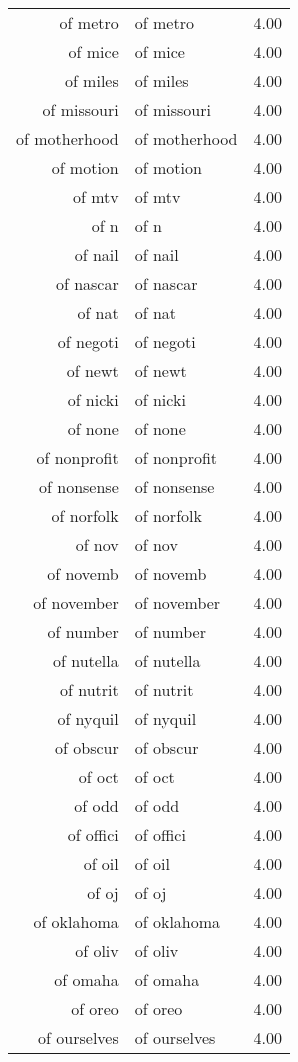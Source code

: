 \begin{table}[ht]
\begin{tabular}{rlr}
  of metro & of metro & 4.00 \\ 
  of mice & of mice & 4.00 \\ 
  of miles & of miles & 4.00 \\ 
  of missouri & of missouri & 4.00 \\ 
  of motherhood & of motherhood & 4.00 \\ 
  of motion & of motion & 4.00 \\ 
  of mtv & of mtv & 4.00 \\ 
  of n & of n & 4.00 \\ 
  of nail & of nail & 4.00 \\ 
  of nascar & of nascar & 4.00 \\ 
  of nat & of nat & 4.00 \\ 
  of negoti & of negoti & 4.00 \\ 
  of newt & of newt & 4.00 \\ 
  of nicki & of nicki & 4.00 \\ 
  of none & of none & 4.00 \\ 
  of nonprofit & of nonprofit & 4.00 \\ 
  of nonsense & of nonsense & 4.00 \\ 
  of norfolk & of norfolk & 4.00 \\ 
  of nov & of nov & 4.00 \\ 
  of novemb & of novemb & 4.00 \\ 
  of november & of november & 4.00 \\ 
  of number & of number & 4.00 \\ 
  of nutella & of nutella & 4.00 \\ 
  of nutrit & of nutrit & 4.00 \\ 
  of nyquil & of nyquil & 4.00 \\ 
  of obscur & of obscur & 4.00 \\ 
  of oct & of oct & 4.00 \\ 
  of odd & of odd & 4.00 \\ 
  of offici & of offici & 4.00 \\ 
  of oil & of oil & 4.00 \\ 
  of oj & of oj & 4.00 \\ 
  of oklahoma & of oklahoma & 4.00 \\ 
  of oliv & of oliv & 4.00 \\ 
  of omaha & of omaha & 4.00 \\ 
  of oreo & of oreo & 4.00 \\ 
  of ourselves & of ourselves & 4.00 \\ 

\end{tabular}
\end{table}
